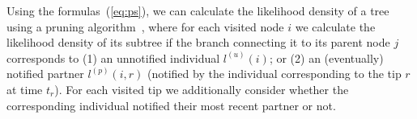 \documentclass[a4paper,10pt]{article}
\begin{document}
Using the formulas~(\ref{eq:ps}), we can calculate the likelihood density of a tree using a pruning algorithm~\citep{10.1093/sysbio/22.3.240}, where for each visited node $i$ we calculate the likelihood density of its subtree if the branch connecting it to its parent node $j$ corresponds to (1) an unnotified individual $l^{(u)}(i)$; or (2) an (eventually) notified partner $l^{(p)}(i, r)$ (notified by the individual corresponding to the tip $r$ at time $t_r$). For each visited tip we additionally consider whether the corresponding individual notified their most recent partner or not.

\end{document}
